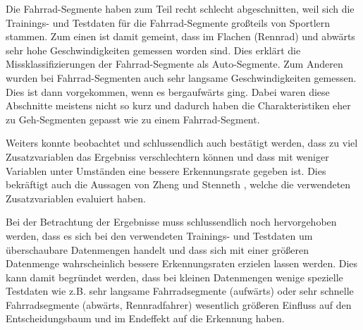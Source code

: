 Die Fahrrad-Segmente haben zum Teil recht schlecht abgeschnitten, weil sich die Trainings- und Testdaten für die Fahrrad-Segmente großteils von Sportlern stammen. Zum einen ist damit gemeint, dass im Flachen (Rennrad) und abwärts sehr hohe Geschwindigkeiten gemessen worden sind. Dies erklärt die Missklassifizierungen der Fahrrad-Segmente als Auto-Segmente. Zum Anderen wurden bei Fahrrad-Segmenten auch sehr langsame Geschwindigkeiten gemessen. Dies ist dann vorgekommen, wenn es bergaufwärts ging. Dabei waren diese Abschnitte meistens nicht so kurz und dadurch haben die Charakteristiken eher zu Geh-Segmenten gepasst wie zu einem Fahrrad-Segment.

Weiters konnte beobachtet und schlussendlich auch bestätigt werden, dass zu viel Zusatzvariablen das Ergebniss verschlechtern können und dass mit weniger Variablen unter Umständen eine bessere Erkennungsrate gegeben ist. Dies bekräftigt auch die Aussagen von Zheng \cite{zheng_understanding_2010} und Stenneth \cite{stenneth_transportation_2011}, welche die verwendeten Zusatzvariablen evaluiert haben. 

Bei der Betrachtung der Ergebnisse muss schlussendlich noch hervorgehoben werden, dass es sich bei den verwendeten Trainings- und Testdaten um überschaubare Datenmengen handelt und dass sich mit einer größeren Datenmenge wahrscheinlich bessere Erkennungsraten erzielen lassen werden. Dies kann damit begründet werden, dass bei kleinen Datenmengen wenige spezielle Testdaten wie z.B. sehr langsame Fahrradsegmente (aufwärts) oder sehr schnelle Fahrradsegmente (abwärts, Rennradfahrer) wesentlich größeren Einfluss auf den Entscheidungsbaum und im Endeffekt auf die Erkennung haben. 